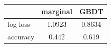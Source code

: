 \begin{tabular}{lcc}
\toprule
 & marginal & GBDT \\
\midrule
log loss & 1.0923 & 0.8634 \\
accuracy & 0.442 & 0.619 \\
\bottomrule
\end{tabular}
